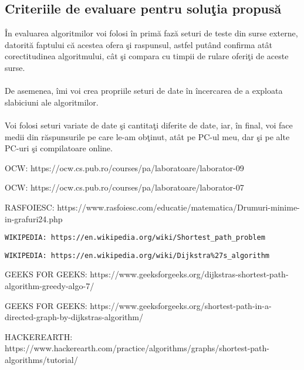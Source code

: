 \documentclass[runningheads]{llncs}
\begin{document}
\subsection{Criteriile de evaluare pentru solu\c{t}ia propus\u{a}}
\hspace{6pt}\^{I}n evaluarea algoritmilor voi folosi \^{i}n prim\u{a} faz\u{a} seturi de teste din surse externe, datorit\u{a} faptului c\u{a} acestea ofera \c{s}i raspunsul, astfel put\^{a}nd confirma at\^{a}t corectitudinea algoritmului, c\^{a}t \c{s}i compara cu timpii de rulare oferi\c{t}i de aceste surse.
\paragraph{}De asemenea, \^{i}mi voi crea propriile seturi de date \^{i}n \^{i}ncercarea de a exploata slabiciuni ale algoritmilor.
\paragraph{}Voi folosi seturi variate de date \c{s}i cantita\c{t}i diferite de date, iar, \^{i}n final, voi face medii din r\u{a}spunsurile pe care le-am ob\c{t}inut, at\^{a}t pe PC-ul meu, dar \c{s}i pe alte PC-uri \c{s}i compilatoare online.

\begin{thebibliography}{8}
OCW: https://ocw.cs.pub.ro/courses/pa/laboratoare/laborator-09

OCW: https://ocw.cs.pub.ro/courses/pa/laboratoare/laborator-07

RASFOIESC: https://www.rasfoiesc.com/educatie/matematica/Drumuri-minime-in-grafuri24.php

\begin{verbatim}
WIKIPEDIA: https://en.wikipedia.org/wiki/Shortest_path_problem
\end{verbatim}

\begin{verbatim}
WIKIPEDIA: https://en.wikipedia.org/wiki/Dijkstra%27s_algorithm
\end{verbatim}

GEEKS FOR GEEKS: https://www.geeksforgeeks.org/dijkstras-shortest-path-algorithm-greedy-algo-7/

GEEKS FOR GEEKS: https://www.geeksforgeeks.org/shortest-path-in-a-directed-graph-by-dijkstras-algorithm/

HACKEREARTH: https://www.hackerearth.com/practice/algorithms/graphs/shortest-path-algorithms/tutorial/
\end{thebibliography}
%
%
%
%
%
\end{document}
